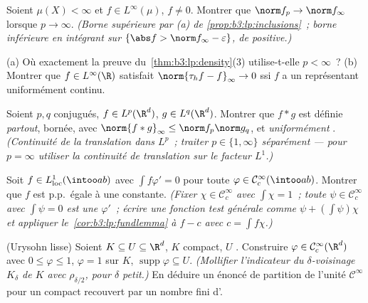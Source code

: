 \begin{exercise}[$\star\star$]\label{exo:b3:lp:4}
Soient $\mu(X) < \infty$ et $f \in L^\infty(\mu)$, $f \neq
0$. Montrer que $\norm f_p \to \norm f_\infty$ lorsque $p
\to \infty$.
\emph{(Borne supérieure par (a) de
\cref{prop:b3:lp:inclusions}~; borne inférieure en intégrant
sur $\{\abs f > \norm f_\infty - \varepsilon\}$, de 
positive.)}
\end{exercise}

\begin{exercise}[$\star\star$]\label{exo:b3:lp:5}
(a) Où exactement la preuve
du~\cref{thm:b3:lp:density}(3) utilise-t-elle $p < \infty$~?
(b) Montrer que $f \in L^\infty(\R)$ satisfait
$\norm{\tau_hf - f}_\infty \to 0$ ssi $f$ a un représentant
uniformément continu.
\end{exercise}

\begin{exercise}[$\star\star$]\label{exo:b3:lp:6}
Soient $p, q$ conjugués, $f \in L^p(\R^d)$, $g \in
L^q(\R^d)$. Montrer que $f * g$ est définie
\emph{partout}, bornée, avec $\norm{f*g}_\infty \leq \norm
f_p\norm g_q$, et \emph{uniformément }.
\emph{(Continuité de la translation dans $L^p$~; traiter $p
\in \{1, \infty\}$ séparément --- pour $p = \infty$ utiliser
la continuité de translation sur le facteur $L^1$.)}
\end{exercise}

\begin{exercise}[$\star\star$]\label{exo:b3:lp:7}
Soit $f \in L^1_{\mathrm{loc}}(\intoo ab)$ avec
$\int f\varphi' = 0$ pour toute $\varphi \in \mathcal
C^\infty_c(\intoo ab)$. Montrer que $f$ est p.p.\ égale à une
constante. \emph{(Fixer $\chi \in \mathcal C_c^\infty$ avec
$\int\chi = 1$~; toute $\psi \in \mathcal C_c^\infty$ avec
$\int\psi = 0$ est une $\varphi'$~; écrire une fonction test
générale comme $\psi + (\int\psi)\chi$ et appliquer
le~\cref{cor:b3:lp:fundlemma} à $f - c$ avec $c = \int
f\chi$.)}
\end{exercise}

\begin{exercise}[$\star\star\star$]\label{exo:b3:lp:8}
(Urysohn lisse) Soient $K \subseteq U \subseteq \R^d$, $K$
compact, $U$ . Construire $\varphi \in \mathcal
C^\infty_c(\R^d)$ avec $0 \leq \varphi \leq 1$, $\varphi =
1$ sur $K$, $\operatorname{supp}\varphi \subseteq U$.
\emph{(Mollifier l'indicateur du $\delta$-voisinage
$K_\delta$ de $K$ avec $\rho_{\delta/2}$, pour $\delta$
petit.)}
En déduire un énoncé de partition de l'unité $\mathcal
C^\infty$ pour un compact recouvert par un nombre fini
d'.
\end{exercise}

